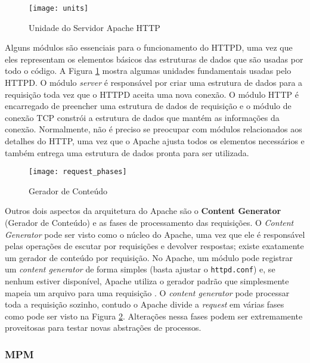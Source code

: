 \begin{figure}[!h]
  \centering
  \texttt{[image: units]} 
  \caption{Unidade do Servidor Apache HTTP}
  \label{fig:units} 
\end{figure}

Alguns módulos são essenciais para o funcionamento do HTTPD, uma vez que eles
representam os elementos básicos das estruturas de dados que são usadas por
todo o código. A Figura \ref{fig:units} mostra algumas unidades fundamentais
usadas pelo HTTPD. O módulo \textit{server} é responsável por criar uma estrutura de
dados para a requisição toda vez que o HTTPD aceita uma nova conexão. O módulo
HTTP é encarregado de preencher uma estrutura de dados de requisição e o
módulo de conexão TCP constrói a estrutura de dados que mantém as informações
da conexão. Normalmente, não é preciso se preocupar com módulos relacionados
aos detalhes do HTTP, uma vez que o Apache ajusta todos os elementos necessários
e também entrega uma estrutura de dados pronta para ser utilizada.

\begin{figure}[!h]
  \centering
  \texttt{[image: request\_phases]} 
	\caption[Gerador de Conteúdo]{Gerador de Conteúdo \citep{apache_module_book}}
  \label{fig:content_generator} 
\end{figure}

Outros dois aspectos da arquitetura do Apache são o \textbf{Content Generator}
(Gerador de Conteúdo) e as fases de processamento das requisições. O
\textit{Content Generator} pode ser visto como o núcleo do Apache, uma vez que
ele é responsável pelas operações de escutar por requisições e devolver
respostas; existe exatamente um gerador de conteúdo por requisição. No Apache,
um módulo pode registrar um \textit{content generator} de forma simples (basta
ajustar o \texttt{httpd.conf}) e, se nenhum estiver disponível, Apache utiliza
o gerador padrão que simplesmente mapeia um arquivo para uma requisição
\citep{apache_module_book}. O \textit{content generator} pode processar toda a
requisição sozinho, contudo o Apache divide a \textit{request} em várias fases
como pode ser visto na Figura \ref{fig:content_generator}. Alterações nessa
fases podem ser extremamente proveitosas para testar novas abstrações de
processos.

\subsubsection{MPM}
\label{sec:prefork}

